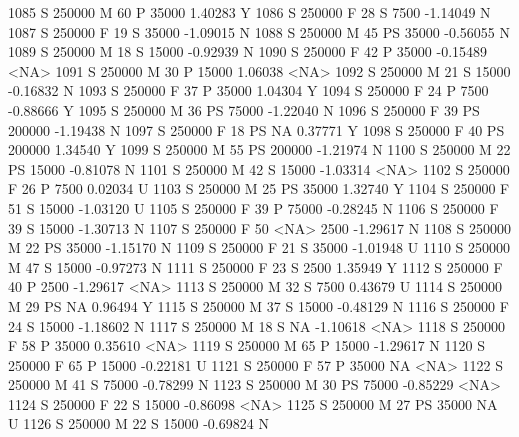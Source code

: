 \documentclass{article}
\begin{document}
\begin{Schunk}
\begin{Soutput}
1085      S     250000   M  60         P  35000   1.40283    Y
1086      S     250000   F  28         S   7500  -1.14049    N
1087      S     250000   F  19         S  35000  -1.09015    N
1088      S     250000   M  45        PS  35000  -0.56055    N
1089      S     250000   M  18         S  15000  -0.92939    N
1090      S     250000   F  42         P  35000  -0.15489 <NA>
1091      S     250000   M  30         P  15000   1.06038 <NA>
1092      S     250000   M  21         S  15000  -0.16832    N
1093      S     250000   F  37         P  35000   1.04304    Y
1094      S     250000   F  24         P   7500  -0.88666    Y
1095      S     250000   M  36        PS  75000  -1.22040    N
1096      S     250000   F  39        PS 200000  -1.19438    N
1097      S     250000   F  18        PS     NA   0.37771    Y
1098      S     250000   F  40        PS 200000   1.34540    Y
1099      S     250000   M  55        PS 200000  -1.21974    N
1100      S     250000   M  22        PS  15000  -0.81078    N
1101      S     250000   M  42         S  15000  -1.03314 <NA>
1102      S     250000   F  26         P   7500   0.02034    U
1103      S     250000   M  25        PS  35000   1.32740    Y
1104      S     250000   F  51         S  15000  -1.03120    U
1105      S     250000   F  39         P  75000  -0.28245    N
1106      S     250000   F  39         S  15000  -1.30713    N
1107      S     250000   F  50      <NA>   2500  -1.29617    N
1108      S     250000   M  22        PS  35000  -1.15170    N
1109      S     250000   F  21         S  35000  -1.01948    U
1110      S     250000   M  47         S  15000  -0.97273    N
1111      S     250000   F  23         S   2500   1.35949    Y
1112      S     250000   F  40         P   2500  -1.29617 <NA>
1113      S     250000   M  32         S   7500   0.43679    U
1114      S     250000   M  29        PS     NA   0.96494    Y
1115      S     250000   M  37         S  15000  -0.48129    N
1116      S     250000   F  24         S  15000  -1.18602    N
1117      S     250000   M  18         S     NA  -1.10618 <NA>
1118      S     250000   F  58         P  35000   0.35610 <NA>
1119      S     250000   M  65         P  15000  -1.29617    N
1120      S     250000   F  65         P  15000  -0.22181    U
1121      S     250000   F  57         P  35000        NA <NA>
1122      S     250000   M  41         S  75000  -0.78299    N
1123      S     250000   M  30        PS  75000  -0.85229 <NA>
1124      S     250000   F  22         S  15000  -0.86098 <NA>
1125      S     250000   M  27        PS  35000        NA    U
1126      S     250000   M  22         S  15000  -0.69824    N

\end{Soutput}
\end{Schunk}
\end{document}
